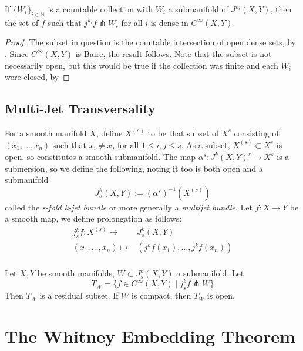 \documentclass[12pt]{article}
\begin{document}
\begin{corollary}
    If $\{W_i\}_{i\in \mathbb{N}}$ is a countable collection with $W_i$ a submanifold of $J^{k_i}(X, Y)$, then the set of $f$ such that $j^{k_i} f \pitchfork W_i$ for all $i$ is dense in $C^\infty(X, Y)$. 
\end{corollary}

\begin{proof}
    The subset in question is the countable intersection of open dense sets, by . Since $C^\infty(X, Y)$ is Baire, the result follows. Note that the subset is not necessarily open, but this would be true if the collection was finite and each $W_i$ were closed,  by 
\end{proof}




\subsection{Multi-Jet Transversality}
For a smooth manifold $X$, define $X^{(s)}$ to be that subset of $X^s$ consisting of $(x_1, \dots, x_n)$ such that $x_i \neq x_j$ for all $1 \leq i, j \leq s$. As a subset, $X^{(s)} \subset X^s$ is open, so constitutes a smooth submanifold. The map $\alpha^s: J^k(X, Y)^s \to X^s$ is a submersion, so we define the following, noting it too is both open and a submanifold
$$J_s^k(X, Y) := (\alpha^s)^{-1}(X^{(s)})$$
called the \emph{s-fold k-jet bundle} or more generally a \emph{multijet bundle}. Let $f: X \to Y$ be a smooth map, we define prolongation as follows: 
\begin{align*}
    j^k_s f : X^{(s)} \to & J^k_s(X, Y) \\ 
    (x_1, \dots, x_n) \mapsto & (j^k f(x_1), \dots, j^k f(x_n)) \\  
\end{align*}



\begin{theorem}  \label{multi trans}
    Let $X, Y$ be smooth manifolds, $W \subset J^k_s(X, Y)$ a submanifold. Let
    $$
    T_W = \{ f\in C^\infty(X, Y) \mid j^k_s f \pitchfork W\}
    $$
    Then $T_W$ is a residual subset. If $W$ is compact, then $T_W$ is open. 
\end{theorem}



\section{The Whitney Embedding Theorem}
\end{document}
